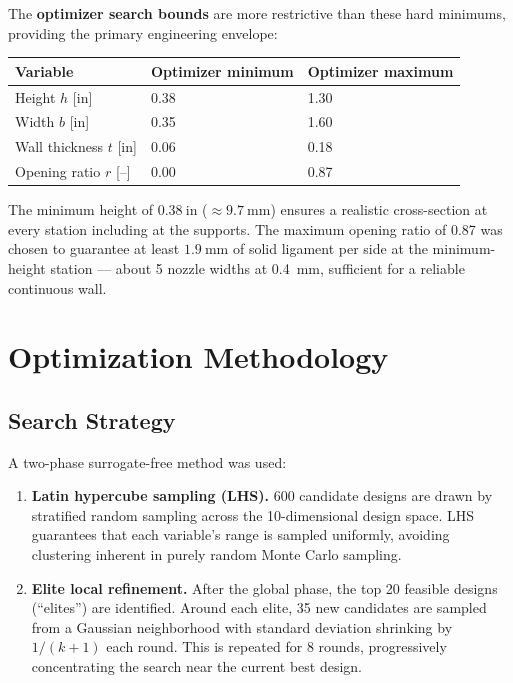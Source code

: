 \documentclass[11pt,letterpaper]{article}
\begin{document}
The \textbf{optimizer search bounds} are more restrictive than these hard
minimums, providing the primary engineering envelope:

\begin{center}
\begin{tabular}{lll}
\toprule
Variable & Optimizer minimum & Optimizer maximum \\
\midrule
Height $h$ [in]         & 0.38 & 1.30 \\
Width $b$ [in]          & 0.35 & 1.60 \\
Wall thickness $t$ [in] & 0.06 & 0.18 \\
Opening ratio $r$ [--]  & 0.00 & 0.87 \\
\bottomrule
\end{tabular}
\end{center}

The minimum height of $0.38\ \mathrm{in}$ ($\approx 9.7\ \mathrm{mm}$) ensures
a realistic cross-section at every station including at the supports.  The
maximum opening ratio of 0.87 was chosen to guarantee at least $1.9\ \mathrm{mm}$
of solid ligament per side at the minimum-height station --- about 5 nozzle
widths at 0.4~mm, sufficient for a reliable continuous wall.


\section{Optimization Methodology}
\label{sec:optimization}

\subsection{Search Strategy}

A two-phase surrogate-free method was used:

\begin{enumerate}
  \item \textbf{Latin hypercube sampling (LHS).}
    600 candidate designs are drawn by stratified random sampling across the
    10-dimensional design space.  LHS guarantees that each variable's range
    is sampled uniformly, avoiding clustering inherent in purely random
    Monte Carlo sampling.

  \item \textbf{Elite local refinement.}
    After the global phase, the top 20 feasible designs (``elites'') are
    identified.  Around each elite, 35 new candidates are sampled from a
    Gaussian neighborhood with standard deviation shrinking by $1/(k+1)$
    each round.  This is repeated for 8 rounds, progressively concentrating
    the search near the current best design.
\end{enumerate}
\end{document}
